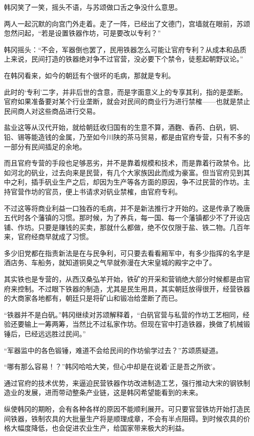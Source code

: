 韩冈笑了一笑，摇头不语，与苏颂做口舌之争没什么意思。

两人一起沉默的向宫门外走着。走了一阵，已经出了文德门，宫墙就在眼前，苏颂忽然问起，“若是设置铁器作坊，可是要改以专利？”

韩冈摇头：“不会，军器倒也罢了，民用铁器怎么可能让官府专利？从成本和品质上来说，民间打造的铁器绝对争不过官营，没必要下个禁令，徒惹起朝野议论。”

在韩冈看来，如今的朝廷有个很坏的毛病，那就是专利。

此时的‘专利’二字，并非后世的含意，而是字面意义上的专享其利，指的是垄断。官府如果准备要对某个行业垄断，就会对民间的商业行为进行禁榷——也就是禁止民间商人对这些商品进行交易。

盐业这等从汉代开始，就给朝廷收归国有的生意不算，酒麴、香药、白矾，铜、铅、锡等能造钱的金属，乃至如今川陕的茶马贸易，都是由官府专营，只有不多的一部分有民间插足的余地。

而且官府专营的手段也足够恶劣，并不是靠着规模和技术，而是靠着行政禁令。比如河北的矾业，过去向来是民营，有几个大家族因此而成为豪富。但当官府见到其中之利，插手矾业生产之后，却因为生产等各方面的原因，争不过民营的作坊。主持官营作坊的官员，便上书请求对矾业禁榷，由官府专利。

不过这等将商业利益一口独吞的毛病，并不是新法推行才开始的。这是传承了晚唐五代时各个藩镇的习惯。那时候，为了养兵，每一国、每一个藩镇都少不了开设店铺、作坊。只要是赚钱的买卖，那就什么都做，绝不仅仅限于盐、铁二物。几百年来，官府经商早就成了习惯。

多少旧党都在指责新法是在与民争利，可只要去看看厢军中，有多少指挥的名字是酒店务、车船务，就知道铜臭之气早就弥漫在大宋皇城的殿宇之中了。

其实铁也是专营的，从西汉桑弘羊开始，铁矿的开采和营销绝大部分时候都是由官府来控制。不过眼下铁器的制造，尤其是民生用具，其实朝廷放得很开，经营铁器的大商家各地都有，朝廷只是将矿山和锻冶给垄断了而已。

“铁器并不是白矾。”韩冈继续对苏颂解释着，“白矾官营与私营的作坊工艺相同，经验还要输上一筹两筹，当然比不过私家作坊。但现在官中打造铁器，换做了机械锻锤后，已经远远胜过民间。”

“军器监中的各色锻锤，难道不会给民间的作坊偷学过去？”苏颂质疑道。

“哪有那么容易！？”韩冈哈哈大笑，但心中却是在说着‘正是吾之所欲’。

通过官府的技术优势，来逼迫民营铁器作坊改进制造工艺，强行推动大宋的钢铁制造业的发展，进而带动整条产业链，这是韩冈希望能看到的未来。

纵使韩冈的期盼，会有各种各样的原因不能顺利展开。可只要官营铁坊开始打造民间铁器，铁制农具的大批量生产将是顺理成章，不会有半点阻碍。到时候农具的价格大幅度降低，也会促进农业生产，给国家带来极大的利益。

